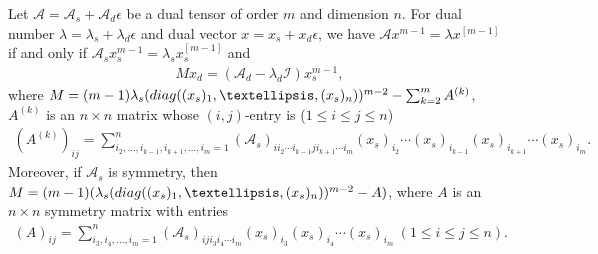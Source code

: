 \documentclass[10pt,a4paper]{amsart}
\begin{document}
\begin{thm}
Let $\mathcal{A}=\mathcal{A}_s+\mathcal{A}_d\epsilon$ be a dual tensor of order $m$ and dimension $n$. For dual number $\lambda=\lambda_s+\lambda_d\epsilon$ and dual vector $x=x_s+x_d\epsilon$, we have $\mathcal{A}x^{m-1}=\lambda x^{[m-1]}$ if and only if $\mathcal{A}_sx_s^{m-1}=\lambda_sx_s^{[m-1]}$ and
\begin{eqnarray*}
Mx_d=(\mathcal{A}_d-\lambda_d\mathcal{I})x_s^{m-1},
\end{eqnarray*}
where $M=(m-1)\lambda_s({\rm diag}((x_s)_1,\ldots,(x_s)_n))^{m-2}-\sum_{k=2}^mA^{(k)}$, $A^{(k)}$ is an $n\times n$ matrix whose $(i,j)$-entry is ($1\leq i\leq j\leq n$)
\begin{eqnarray*}
(A^{(k)})_{ij}=\sum_{i_2,\ldots,i_{k-1},i_{k+1},\ldots,i_m=1}^n(\mathcal{A}_s)_{ii_2\cdots i_{k-1}ji_{k+1}\cdots i_m}(x_s)_{i_2}\cdots (x_s)_{i_{k-1}}(x_s)_{i_{k+1}}\cdots(x_s)_{i_m}.
\end{eqnarray*}
Moreover, if $\mathcal{A}_s$ is symmetry, then $M=(m-1)(\lambda_s({\rm diag}((x_s)_1,\ldots,(x_s)_n))^{m-2}-A)$, where $A$ is an $n\times n$ symmetry matrix with entries
\begin{eqnarray*}
(A)_{ij}=\sum_{i_3,i_4,\ldots,i_m=1}^n(\mathcal{A}_s)_{iji_3i_4\cdots i_m}(x_s)_{i_3}(x_s)_{i_4}\cdots(x_s)_{i_m}~(1\leq i\leq j\leq n).
\end{eqnarray*}
\end{thm}
\end{document}
